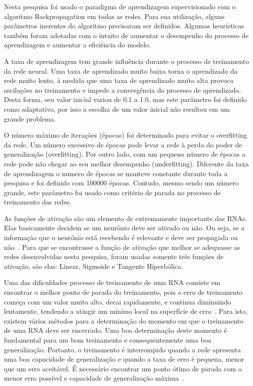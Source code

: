 Nesta pesquisa foi usado o paradigma de aprendizagem supervisionado com o algoritmo Backpropagation em todas as redes. Para sua utilização, alguns parâmetros inerentes do algoritmo precisaram ser definidos. Algumas heurísticas também foram adotadas com o intuito de aumentar o desempenho do processo de aprendizagem e aumentar a eficiência do modelo.

A taxa de aprendizagem tem grande influência durante o processo de treinamento da
rede neural. Uma taxa de aprendizado muito baixa torna o aprendizado da rede muito lento, à medida que uma taxa de aprendizado muito alta provoca oscilações no treinamento e impede a
convergência do processo de aprendizado. Desta forma, seu valor inicial variou de 0.1 a 1.0, mas este parâmetro foi definido como adaptativo, por isso a escolha de um valor inicial não resultou em um grande problema. 

O número máximo de iterações (épocas) foi determinado para evitar o overfitting da rede. Um número excessivo de épocas pode levar a rede à perda do poder de generalização (overfitting). Por outro lado, com um pequeno número de épocas a rede pode não chegar ao seu melhor desempenho (underfitting). Diferente da taxa de aprendizagem o numero de épocas se manteve constante durante toda a pesquisa e foi definido com 100000 épocas. Contudo, mesmo sendo um número grande, este parâmetro foi usado como critério de parada no processo de treinamento das redes.

As funções de ativação são um elemento de extremamente importante das RNAs. Elas basicamente decidem se um neurônio deve ser ativado ou não. Ou seja, se a informação que o neurônio está recebendo é relevante e deve ser propagada ou não~\cite{DeepLearningBook}. Para que se encontrasse a função de ativação que melhor se adequasse as redes desenvolvidas nesta pesquisa, foram usadas somente três funções de ativação, são elas: Linear, Sigmoide e Tangente Hiperbólica.

Uma das dificuldades processo de treinamento de uma RNA consiste em encontrar o melhor ponto de parada do treinamento, pois o erro de treinamento começa com um valor muito alto, decai rapidamente, e continua diminuindo lentamente, tendendo a atingir um mínimo local na superfície de erro~\cite{haykin2007redes}. Para isto, existem vários métodos para a determinação do momento em que o treinamento de uma RNA deve ser encerrado. Uma boa determinação deste momento é fundamental para um bom treinamento e consequentemente uma boa generalização. Portanto, o treinamento é interrompido quando a rede apresenta uma boa capacidade de generalização e quando a taxa de erro é pequena, menor que um erro aceitável. É necessário encontrar um ponto ótimo de parada com o menor erro possível e capacidade de generalização máxima~\cite{barros2018avaliaccao}.

